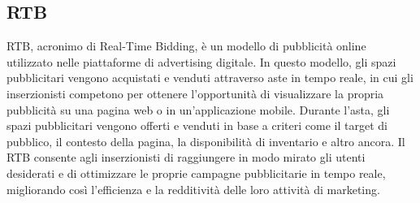 \vspace{2em}
\subsection*{RTB}
RTB, acronimo di Real-Time Bidding, è un modello di pubblicità online utilizzato nelle piattaforme di advertising digitale. In questo modello, gli spazi pubblicitari vengono acquistati e venduti attraverso aste in tempo reale, in cui gli inserzionisti competono per ottenere l'opportunità di visualizzare la propria pubblicità su una pagina web o in un'applicazione mobile. Durante l'asta, gli spazi pubblicitari vengono offerti e venduti in base a criteri come il target di pubblico, il contesto della pagina, la disponibilità di inventario e altro ancora. Il RTB consente agli inserzionisti di raggiungere in modo mirato gli utenti desiderati e di ottimizzare le proprie campagne pubblicitarie in tempo reale, migliorando così l'efficienza e la redditività delle loro attività di marketing.